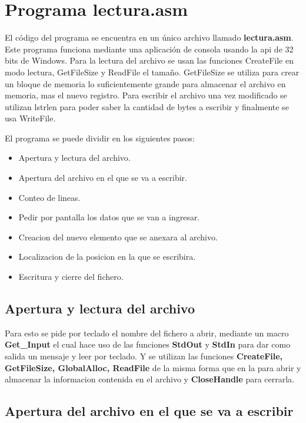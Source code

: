 
\section{Programa lectura.asm}

El código del programa se encuentra en un único archivo llamado \textbf{lectura.asm}.
Este programa funciona mediante una aplicación de consola usando la api de 32
bits de Windows. Para la lectura del archivo se usan las funciones
CreateFile en modo lectura, GetFileSize y ReadFile el tamaño. GetFileSize
se utiliza para crear un bloque de memoria lo suficientemente grande
para almacenar el archivo en memoria, mas el nuevo registro. Para escribir
el archivo una vez modificado se utilizan lstrlen para poder saber la cantidad
de bytes a escribir y finalmente se usa WriteFile.


El programa se puede dividir en los siguientes pasos:
\begin{itemize}
    \item Apertura y lectura del archivo.
    \item Apertura del archivo en el que se va a escribir.
    \item Conteo de lineas.
    \item Pedir por pantalla los datos que se van a ingresar.
    \item Creacion del nuevo elemento que se anexara al archivo.
    \item Localizacion de la posicion en la que se escribira.
    \item Escritura y cierre del fichero.
\end{itemize}

\subsection*{Apertura y lectura del archivo}

    Para esto se pide por teclado el nombre del fichero a abrir, mediante un
    macro \textbf{Get\_Input} el cual hace uso de las funciones \textbf{StdOut}
    y \textbf{StdIn} para dar como salida un mensaje y leer por teclado.
    Y se utilizan las funciones \textbf{CreateFile, GetFileSize, GlobalAlloc,
    ReadFile} de la misma forma que en la \Cite{pract4} para abrir y almacenar
    la informacion contenida en el archivo y \textbf{CloseHandle} para cerrarla.

\subsection*{Apertura del archivo en el que se va a escribir}


